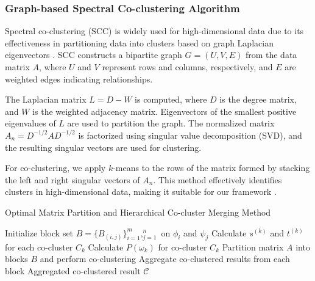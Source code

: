 \subsubsection{Graph-based Spectral Co-clustering Algorithm}
Spectral co-clustering (SCC) is widely used for high-dimensional data due to its effectiveness in partitioning data into clusters based on graph Laplacian eigenvectors \cite{vonluxburg2007TutorialSpectralClustering}. SCC constructs a bipartite graph $G=(U,V,E)$ from the data matrix $A$, where $U$ and $V$ represent rows and columns, respectively, and $E$ are weighted edges indicating relationships.

The Laplacian matrix $L = D - W$ is computed, where $D$ is the degree matrix, and $W$ is the weighted adjacency matrix. Eigenvectors of the smallest positive eigenvalues of $L$ are used to partition the graph. The normalized matrix $A_n = D^{-1/2} A D^{-1/2}$ is factorized using singular value decomposition (SVD), and the resulting singular vectors are used for clustering.

For co-clustering, we apply $k$-means to the rows of the matrix formed by stacking the left and right singular vectors of $A_n$. This method effectively identifies clusters in high-dimensional data, making it suitable for our framework \cite{dhillon2001CoclusteringDocumentsWords}.

\begin{algorithm}[ht]
    \caption{Optimal Matrix Partition and Hierarchical Co-cluster Merging Method}\label{alg:method}
    \begin{algorithmic}[1]
        \STATE Initialize block set $B = \{B_{(i,j)}\}_{i=1}^m,_{j=1}^n$ on $\phi_i$ and $\psi_j$
        \STATE Calculate $s^{(k)}$ and $t^{(k)}$ for each co-cluster $C_k$
        \STATE Calculate $P(\omega_k)$ for co-cluster $C_k$
        \STATE Partition matrix $A$ into blocks $B$ and perform co-clustering
        \STATE Aggregate co-clustered results from each block
        \ENDIF
        \ENDFOR
        \RETURN Aggregated co-clustered result $\mathcal{C}$
    \end{algorithmic}
\end{algorithm}

